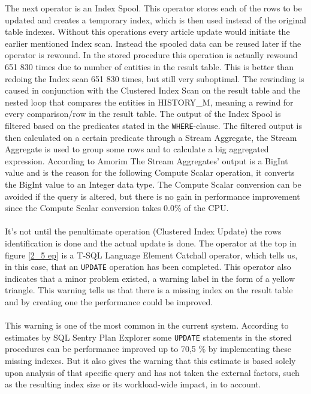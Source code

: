 \documentclass{cslthse-msc}
\begin{document}
The next operator is an Index Spool. This operator stores each of the rows to be updated and creates a temporary index, which is then used instead of the original table indexes. Without this operations every article update would initiate the earlier mentioned Index scan. Instead the spooled data can be reused later if the operator is rewound. In the stored procedure this operation is actually rewound 651 830 times due to number of entities in the result table. This is better than redoing the Index scan 651 830 times, but still very suboptimal. The rewinding is caused in conjunction with the Clustered Index Scan on the result table and the nested loop that compares the entities in HISTORY\_M, meaning a rewind for every comparison/row in the result table. The output of the Index Spool is filtered based on the predicates stated in the \texttt{WHERE}-clause. The filtered output is then calculated on a certain predicate through a Stream Aggregate, the Stream Aggregate   is used to group some rows and to calculate a big aggregated expression. According to Amorim \cite{streamaggregate} The Stream Aggregates' output is a BigInt value and is the reason for the following Compute Scalar operation, it converts the BigInt value to an Integer data type. The Compute Scalar conversion can be avoided if the query is altered, but there is no gain in performance improvement since the Compute Scalar conversion takes 0.0\% of the CPU. \\\\
It's not until the penultimate operation (Clustered Index Update) the rows identification is done and the actual update is done. The operator at the top in figure \ref{2_5 ep} is a T-SQL Language Element Catchall operator, which tells us, in this case, that an \texttt{UPDATE} operation has been completed. This operator also indicates that a minor problem existed, a warning label in the form of a yellow triangle. This warning tells us that there is a missing index on the result table and by creating one the performance could be improved.\\\\
This warning is one of the most common in the current system. According to estimates by SQL Sentry Plan Explorer some \texttt{UPDATE} statements in the stored procedures can be performance improved up to 70,5 \% by implementing these missing indexes. But it also gives the warning that this estimate is based solely upon analysis of that specific query and has not taken the external factors, such as the resulting index size or its workload-wide impact, in to account.\\\\ 
\end{document}
